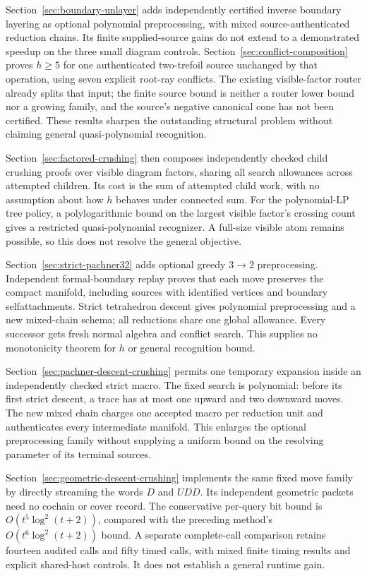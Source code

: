 \documentclass[11pt]{article}
\theoremstyle{remark}
\begin{document}
Section~\ref{sec:boundary-unlayer} adds independently certified inverse
boundary layering as optional polynomial preprocessing, with mixed
source-authenticated reduction chains.  Its finite supplied-source gains
do not extend to a demonstrated speedup on the three small diagram
controls.  Section~\ref{sec:conflict-composition} proves $h\ge5$ for one
authenticated two-trefoil source unchanged by that operation, using seven
explicit root-ray conflicts.  The existing visible-factor router already
splits that input; the finite source bound is neither a router lower bound
nor a growing family, and the source's negative canonical cone has not
been certified.  These results sharpen the outstanding structural problem
without claiming general quasi-polynomial recognition.

Section~\ref{sec:factored-crushing} then composes independently checked
child crushing proofs over visible diagram factors, sharing all search
allowances across attempted children.  Its cost is the sum of attempted
child work, with no assumption about how $h$ behaves under connected sum.
For the polynomial-LP tree policy, a polylogarithmic bound on the largest
visible factor's crossing count gives a restricted quasi-polynomial
recognizer.  A full-size visible atom remains possible, so this does not
resolve the general objective.

Section~\ref{sec:strict-pachner32} adds optional greedy $3\to2$
preprocessing.  Independent formal-boundary replay proves that each move
preserves the compact manifold, including sources with identified vertices
and boundary selfattachments.  Strict tetrahedron descent gives polynomial
preprocessing and a new mixed-chain schema; all reductions share one global
allowance.  Every successor gets fresh normal algebra and conflict search.
This supplies no monotonicity theorem for $h$ or general recognition bound.

Section~\ref{sec:pachner-descent-crushing} permits one temporary expansion
inside an independently checked strict macro.  The fixed search is polynomial:
before its first strict descent, a trace has at most one upward and two
downward moves.  The new mixed chain charges one accepted macro per reduction
unit and authenticates every intermediate manifold.  This enlarges the
optional preprocessing family without supplying a uniform bound on the
resolving parameter of its terminal sources.

Section~\ref{sec:geometric-descent-crushing} implements the same fixed
move family by directly streaming the words $D$ and $UDD$.  Its
independent geometric packets need no cochain or cover record.  The
conservative per-query bit bound is $O(t^5\log^2(t+2))$, compared with
the preceding method's $O(t^6\log^2(t+2))$ bound.  A separate complete-call
comparison retains fourteen audited calls and fifty timed calls, with
mixed finite timing results and explicit shared-host controls.  It does
not establish a general runtime gain.
\end{document}
